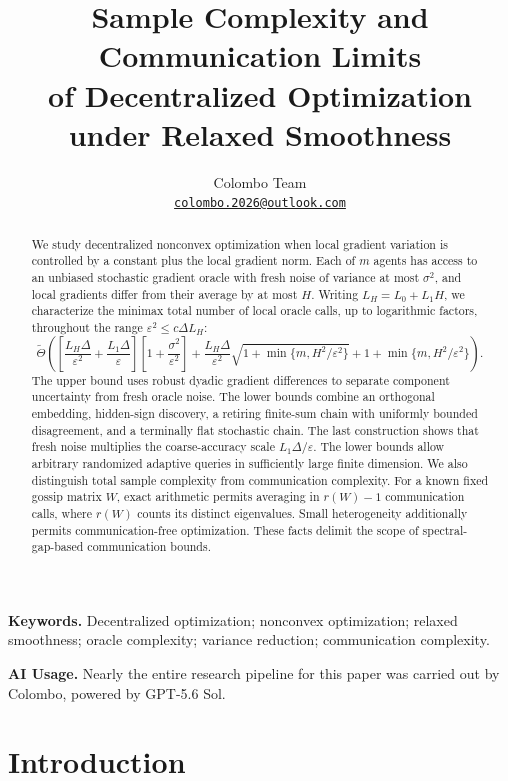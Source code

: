 \documentclass[11pt,a4paper]{article}
\title{Sample Complexity and Communication Limits\\
of Decentralized Optimization\\under Relaxed Smoothness}
\author{Colombo Team\\
\small\href{mailto:colombo.2026@outlook.com}{\texttt{colombo.2026@outlook.com}}}
\date{}
\newcommand{\eps}{\varepsilon}
\theoremstyle{remark}
\begin{document}
\maketitle
\begin{abstract}
We study decentralized nonconvex optimization when local gradient variation
is controlled by a constant plus the local gradient norm. Each of $m$ agents
has access to an unbiased stochastic gradient oracle with fresh noise of
variance at most $\sigma^2$, and local gradients differ from their average
by at most $H$. Writing $L_H=L_0+L_1H$, we characterize the minimax total
number of local oracle calls, up to logarithmic factors, throughout the
range $\eps^2\le c\Delta L_H$:
\[
\widetilde\Theta\!\left(
 \left[\frac{L_H\Delta}{\eps^2}+\frac{L_1\Delta}{\eps}\right]
       \left[1+\frac{\sigma^2}{\eps^2}\right]
 +\frac{L_H\Delta}{\eps^2}
       \sqrt{1+\min\{m,H^2/\eps^2\}}
 +1+\min\{m,H^2/\eps^2\}\right).
\]
The upper bound uses robust dyadic gradient differences to separate
component uncertainty from fresh oracle noise. The lower bounds
combine an orthogonal embedding, hidden-sign discovery, a retiring
finite-sum chain with uniformly bounded disagreement, and a terminally flat
stochastic chain. The last construction shows that fresh noise multiplies
the coarse-accuracy scale $L_1\Delta/\eps$. The lower bounds allow arbitrary
randomized adaptive queries in sufficiently large finite dimension.
We also distinguish total sample complexity from communication complexity.
For a known fixed gossip matrix $W$, exact arithmetic permits averaging in
$r(W)-1$ communication calls, where $r(W)$ counts its distinct eigenvalues.
Small heterogeneity additionally permits communication-free optimization.
These facts delimit the scope of spectral-gap-based communication bounds.
\end{abstract}

\noindent\textbf{Keywords.} Decentralized optimization; nonconvex optimization;
relaxed smoothness; oracle complexity; variance reduction; communication complexity.
\par\medskip
\begin{samepage}
\noindent\textbf{AI Usage.}
Nearly the entire research pipeline for this paper was carried out by
Colombo, powered by GPT-5.6 Sol.
\par
\end{samepage}

\section{Introduction}
\end{document}
